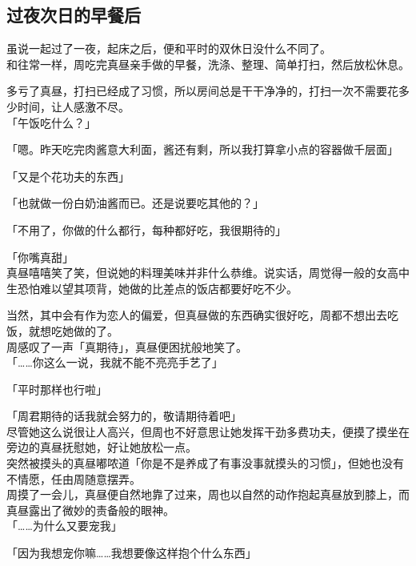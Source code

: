 \subsection{过夜次日的早餐后}

虽说一起过了一夜，起床之后，便和平时的双休日没什么不同了。\\

和往常一样，周吃完真昼亲手做的早餐，洗涤、整理、简单打扫，然后放松休息。

多亏了真昼，打扫已经成了习惯，所以房间总是干干净净的，打扫一次不需要花多少时间，让人感激不尽。\\

「午饭吃什么？」

「嗯。昨天吃完肉酱意大利面，酱还有剩，所以我打算拿小点的容器做千层面」

「又是个花功夫的东西」

「也就做一份白奶油酱而已。还是说要吃其他的？」

「不用了，你做的什么都行，每种都好吃，我很期待的」

「你嘴真甜」\\

真昼嘻嘻笑了笑，但说她的料理美味并非什么恭维。说实话，周觉得一般的女高中生恐怕难以望其项背，她做的比差点的饭店都要好吃不少。

当然，其中会有作为恋人的偏爱，但真昼做的东西确实很好吃，周都不想出去吃饭，就想吃她做的了。\\

周感叹了一声「真期待」，真昼便困扰般地笑了。\\

「……你这么一说，我就不能不亮亮手艺了」

「平时那样也行啦」

「周君期待的话我就会努力的，敬请期待着吧」\\

尽管她这么说很让人高兴，但周也不好意思让她发挥干劲多费功夫，便摸了摸坐在旁边的真昼抚慰她，好让她放松一点。\\

突然被摸头的真昼嘟哝道「你是不是养成了有事没事就摸头的习惯」，但她也没有不情愿，任由周随意摆弄。\\

周摸了一会儿，真昼便自然地靠了过来，周也以自然的动作抱起真昼放到膝上，而真昼露出了微妙的责备般的眼神。\\

「……为什么又要宠我」

「因为我想宠你嘛……我想要像这样抱个什么东西」


